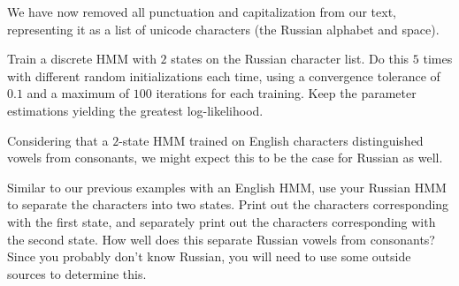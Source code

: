 We have now removed all punctuation and capitalization from our text, representing it as a list of unicode characters (the Russian alphabet and space).

\begin{problem}
Train a discrete HMM with $2$ states on the Russian character list. Do this $5$ times with different random initializations each time, using a convergence tolerance of $0.1$ and a maximum of $100$ iterations for each training. Keep the parameter estimations yielding the greatest log-likelihood.
\end{problem}

Considering that a $2$-state HMM trained on English characters distinguished vowels from consonants, we might expect this to be the case for Russian as well.

\begin{problem}
Similar to our previous examples with an English HMM, use your Russian HMM to separate the characters into two states. Print out the characters corresponding with the first state, and separately print out the characters corresponding with the second state. How well does this separate Russian vowels from consonants? Since you probably don't know Russian, you will need to use some outside sources to determine this.
\end{problem}
